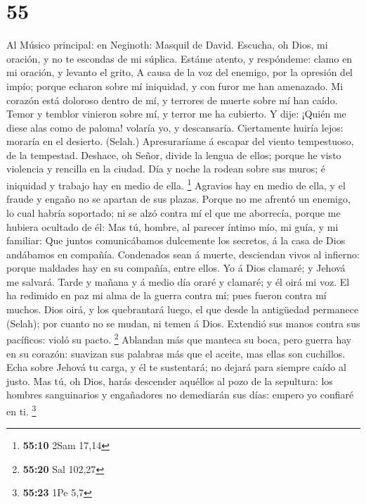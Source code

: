 \hypertarget{section-54}{%
\section{55}\label{section-54}}

 Al Músico principal: en Neginoth: Masquil de David.
Escucha, oh Dios, mi oración, y no te escondas de mi súplica.
 Estáme atento, y respóndeme: clamo en mi oración, y levanto
el grito,  A causa de la voz del enemigo, por la opresión
del impío; porque echaron sobre mí iniquidad, y con furor me han
amenazado.  Mi corazón está doloroso dentro de mí, y
terrores de muerte sobre mí han caído.  Temor y temblor
vinieron sobre mí, y terror me ha cubierto.  Y dije: ¡Quién
me diese alas como de paloma! volaría yo, y descansaría. 
Ciertamente huiría lejos: moraría en el desierto. (Selah.) 
Apresuraríame á escapar del viento tempestuoso, de la tempestad.
 Deshace, oh Señor, divide la lengua de ellos; porque he
visto violencia y rencilla en la ciudad.  Día y noche la
rodean sobre sus muros; é iniquidad y trabajo hay en medio de ella.
\footnote{\textbf{55:10} 2Sam 17,14}  Agravios hay en medio
de ella, y el fraude y engaño no se apartan de sus plazas. 
Porque no me afrentó un enemigo, lo cual habría soportado; ni se alzó
contra mí el que me aborrecía, porque me hubiera ocultado de él:
 Mas tú, hombre, al parecer íntimo mío, mi guía, y mi
familiar:  Que juntos comunicábamos dulcemente los
secretos, á la casa de Dios andábamos en compañía. 
Condenados sean á muerte, desciendan vivos al infierno: porque maldades
hay en su compañía, entre ellos.  Yo á Dios clamaré; y
Jehová me salvará.  Tarde y mañana y á medio día oraré y
clamaré; y él oirá mi voz.  El ha redimido en paz mi alma
de la guerra contra mí; pues fueron contra mí muchos.  Dios
oirá, y los quebrantará luego, el que desde la antigüedad permanece
(Selah); por cuanto no se mudan, ni temen á Dios.  Extendió
sus manos contra sus pacíficos: violó su pacto. \footnote{\textbf{55:20}
  Sal 102,27}  Ablandan más que manteca su boca, pero
guerra hay en su corazón: suavizan sus palabras más que el aceite, mas
ellas son cuchillos.  Echa sobre Jehová tu carga, y él te
sustentará; no dejará para siempre caído al justo.  Mas tú,
oh Dios, harás descender aquéllos al pozo de la sepultura: los hombres
sanguinarios y engañadores no demediarán sus días: empero yo confiaré en
ti. \footnote{\textbf{55:23} 1Pe 5,7}


